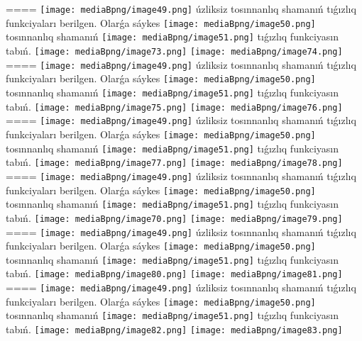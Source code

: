 ====
\texttt{[image: mediaBpng/image49.png]} úzliksiz tosınnanlıq shamanıń tıǵızlıq funkciyaları berilgen. Olarǵa sáykes \texttt{[image: mediaBpng/image50.png]} tosınnanlıq shamanıń \texttt{[image: mediaBpng/image51.png]} tıǵızlıq funkciyasın tabıń. \texttt{[image: mediaBpng/image73.png]} \texttt{[image: mediaBpng/image74.png]}
====
\texttt{[image: mediaBpng/image49.png]} úzliksiz tosınnanlıq shamanıń tıǵızlıq funkciyaları berilgen. Olarǵa sáykes \texttt{[image: mediaBpng/image50.png]} tosınnanlıq shamanıń \texttt{[image: mediaBpng/image51.png]} tıǵızlıq funkciyasın tabıń. \texttt{[image: mediaBpng/image75.png]} \texttt{[image: mediaBpng/image76.png]}
====
\texttt{[image: mediaBpng/image49.png]} úzliksiz tosınnanlıq shamanıń tıǵızlıq funkciyaları berilgen. Olarǵa sáykes \texttt{[image: mediaBpng/image50.png]} tosınnanlıq shamanıń \texttt{[image: mediaBpng/image51.png]} tıǵızlıq funkciyasın tabıń. \texttt{[image: mediaBpng/image77.png]} \texttt{[image: mediaBpng/image78.png]}
====
\texttt{[image: mediaBpng/image49.png]} úzliksiz tosınnanlıq shamanıń tıǵızlıq funkciyaları berilgen. Olarǵa sáykes \texttt{[image: mediaBpng/image50.png]} tosınnanlıq shamanıń \texttt{[image: mediaBpng/image51.png]} tıǵızlıq funkciyasın tabıń. \texttt{[image: mediaBpng/image70.png]} \texttt{[image: mediaBpng/image79.png]}
====
\texttt{[image: mediaBpng/image49.png]} úzliksiz tosınnanlıq shamanıń tıǵızlıq funkciyaları berilgen. Olarǵa sáykes \texttt{[image: mediaBpng/image50.png]} tosınnanlıq shamanıń \texttt{[image: mediaBpng/image51.png]} tıǵızlıq funkciyasın tabıń. \texttt{[image: mediaBpng/image80.png]} \texttt{[image: mediaBpng/image81.png]}
====
\texttt{[image: mediaBpng/image49.png]} úzliksiz tosınnanlıq shamanıń tıǵızlıq funkciyaları berilgen. Olarǵa sáykes \texttt{[image: mediaBpng/image50.png]} tosınnanlıq shamanıń \texttt{[image: mediaBpng/image51.png]} tıǵızlıq funkciyasın tabıń. \texttt{[image: mediaBpng/image82.png]} \texttt{[image: mediaBpng/image83.png]}
